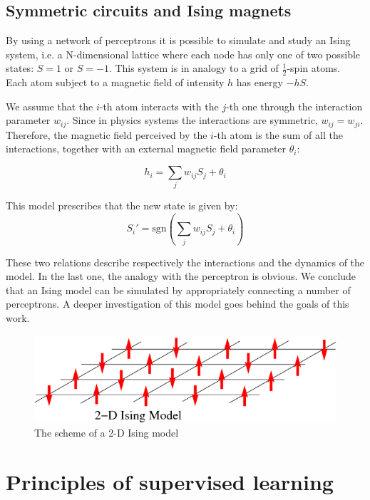 \documentclass[a4paper, twoside]{article}
\begin{document}
    \subsection{Symmetric circuits and Ising magnets}

    By using a network of perceptrons it is possible to simulate and study an Ising system, i.e. a N-dimensional lattice where each node has only one of two possible states: $S=1$ or $S=-1$. This system is in analogy to a grid of $\frac{1}{2}$-spin atoms. Each atom subject to a magnetic field of intensity $h$ has energy $-hS$.

    We assume that the $i$-th atom interacts with the $j$-th one through the interaction parameter $w_{ij}$. Since in physics systems the interactions are symmetric, $w_{ij} = w_{ji}$. Therefore, the magnetic field perceived by the $i$-th atom is the sum of all the interactions, together with an external magnetic field parameter $\theta_i$:

    $$h_i = \sum_j w_{ij}S_j + \theta_i $$

    This model prescribes that the new state is given by:
    $$S_i' = \text{sgn}\left(\sum_j w_{ij}S_j + \theta_i \right) $$

    These two relations describe respectively the interactions and the dynamics of the model. In the last one, the analogy with the perceptron is obvious. We conclude that an Ising model can be simulated by appropriately connecting a number of perceptrons. A deeper investigation of this model goes behind the goals of this work.


    \begin{figure}[H]
        \centering
        \includegraphics[width=0.65\linewidth]{ising.png}
        \caption{The scheme of a 2-D Ising model}
    \end{figure}














\newpage

\section{Principles of supervised learning}
\end{document}
